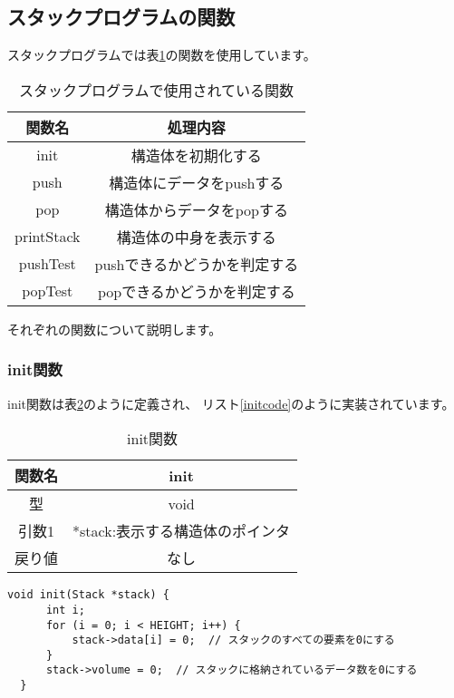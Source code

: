 \documentclass[a4j]{jarticle}
\begin{document}
\subsection{スタックプログラムの関数}
\label{sec:stack}
スタックプログラムでは表\ref{tb:stackfunction}の関数を使用しています。
\begin{table}[h]
  \centering
  \caption{スタックプログラムで使用されている関数}
  \label{tb:stackfunction}
  \begin{tabular}{|c|c|}
    \hline
    関数名        & 処理内容             \\
    \hline
    init       & 構造体を初期化する        \\
    \hline
    push       & 構造体にデータをpushする   \\
    \hline
    pop        & 構造体からデータをpopする   \\
    \hline
    printStack & 構造体の中身を表示する      \\
    \hline
    pushTest   & pushできるかどうかを判定する \\
    \hline
    popTest    & popできるかどうかを判定する  \\
    \hline
  \end{tabular}
\end{table}

それぞれの関数について説明します。

\subsubsection{init関数}
init関数は表\ref{tb:init}のように定義され、
リスト\ref{initcode}のように実装されています。

\begin{table}[h]
  \centering
  \caption{init関数}
  \label{tb:init}
  \begin{tabular}{|c|c|}
    \hline
    関数名 & init                \\
    \hline
    型   & void                \\
    \hline
    引数1 & *stack:表示する構造体のポインタ \\
    \hline
    戻り値 & なし                  \\
    \hline
  \end{tabular}
\end{table}

\begin{lstlisting}[caption=init関数,label=initcode]
    void init(Stack *stack) {
      int i;
      for (i = 0; i < HEIGHT; i++) {
          stack->data[i] = 0;  // スタックのすべての要素を0にする
      }
      stack->volume = 0;  // スタックに格納されているデータ数を0にする
  }
  \end{lstlisting}
\end{document}

